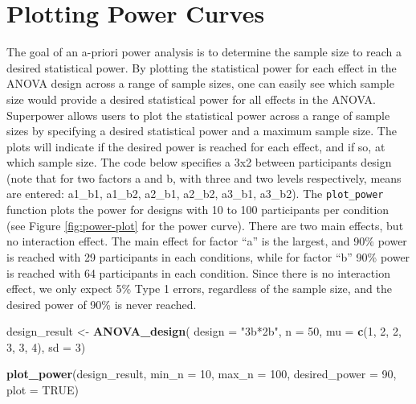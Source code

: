 \documentclass[
  english,
  ,jou,floatsintext]{apa6}
\newenvironment{Shaded}{\begin{snugshade}}{\end{snugshade}}
\newcommand{\DataTypeTok}[1]{\textcolor[rgb]{0.13,0.29,0.53}{#1}}
\newcommand{\DecValTok}[1]{\textcolor[rgb]{0.00,0.00,0.81}{#1}}
\newcommand{\KeywordTok}[1]{\textcolor[rgb]{0.13,0.29,0.53}{\textbf{#1}}}
\newcommand{\NormalTok}[1]{#1}
\newcommand{\OtherTok}[1]{\textcolor[rgb]{0.56,0.35,0.01}{#1}}
\newcommand{\StringTok}[1]{\textcolor[rgb]{0.31,0.60,0.02}{#1}}
\begin{document}
\hypertarget{plotting-power-curves}{%
\section{Plotting Power Curves}\label{plotting-power-curves}}

The goal of an a-priori power analysis is to determine the sample size to reach a desired statistical power.
By plotting the statistical power for each effect in the ANOVA design across a range of sample sizes, one can easily see which sample size would provide a desired statistical power for all effects in the ANOVA.
Superpower allows users to plot the statistical power across a range of sample sizes by specifying a desired statistical power and a maximum sample size.
The plots will indicate if the desired power is reached for each effect, and if so, at which sample size.
The code below specifies a 3x2 between participants design (note that for two factors a and b, with three and two levels respectively, means are entered: a1\_b1, a1\_b2, a2\_b1, a2\_b2, a3\_b1, a3\_b2).
The \texttt{plot\_power} function plots the power for designs with 10 to 100 participants per condition (see Figure \ref{fig:power-plot} for the power curve).
There are two main effects, but no interaction effect.
The main effect for factor \enquote{a} is the largest, and 90\% power is reached with 29 participants in each conditions, while for factor \enquote{b} 90\% power is reached with 64 participants in each condition.
Since there is no interaction effect, we only expect 5\% Type 1 errors, regardless of the sample size, and the desired power of 90\% is never reached.

\begin{Shaded}
\begin{Highlighting}[]
\NormalTok{design_result <-}\StringTok{ }\KeywordTok{ANOVA_design}\NormalTok{(}
  \DataTypeTok{design =} \StringTok{"3b*2b"}\NormalTok{, }\DataTypeTok{n =} \DecValTok{50}\NormalTok{, }
  \DataTypeTok{mu =} \KeywordTok{c}\NormalTok{(}\DecValTok{1}\NormalTok{, }\DecValTok{2}\NormalTok{, }\DecValTok{2}\NormalTok{, }\DecValTok{3}\NormalTok{, }\DecValTok{3}\NormalTok{, }\DecValTok{4}\NormalTok{), }\DataTypeTok{sd =} \DecValTok{3}\NormalTok{)}

\KeywordTok{plot_power}\NormalTok{(design_result, }
    \DataTypeTok{min_n =} \DecValTok{10}\NormalTok{, }\DataTypeTok{max_n =} \DecValTok{100}\NormalTok{, }
    \DataTypeTok{desired_power =} \DecValTok{90}\NormalTok{, }\DataTypeTok{plot =} \OtherTok{TRUE}\NormalTok{)}
\end{Highlighting}
\end{Shaded}
\end{document}
